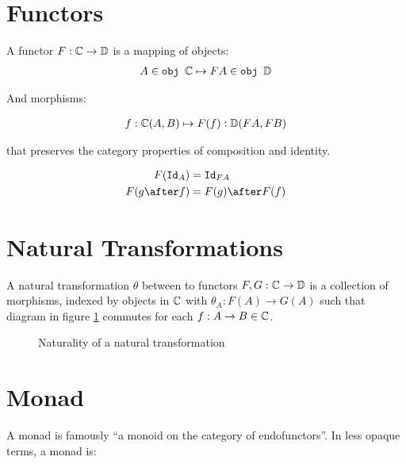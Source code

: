 \documentclass{Report}
\begin{document}
\section{Functors}
A functor $F: \mathbb{C} \rightarrow \mathbb{D}$ is a mapping of objects:
\begin{align}
    A\in\texttt{obj }\mathbb{C} \mapsto FA \in \texttt{obj }\mathbb{D}
\end{align}

And morphisms:

\begin{align}
    f: \mathbb{C}(A, B) \mapsto F(f): \mathbb{D}(FA, FB)
\end{align}

that preserves the category properties of composition and identity.

\begin{align}
    F(\Id{A}) & = \Id{FA} \\
    F(g\after f) & = F(g)\after F(f)
\end{align}

\section{Natural Transformations}

A natural transformation $\theta$ between to functors $F, G: \mathbb{C} \rightarrow \mathbb{D}$ is a collection of morphisms, indexed by objects in $\mathbb{C}$ with  $\theta_A: F(A) \rightarrow G(A)$ such that diagram in figure \ref{Naturality} commutes for each $f: A \rightarrow B \in \mathbb{C}$.

\begin{figure}
    \centering
    \begin{minipage}{0.45\textwidth}
        \label{Naturality}
        \centering
        \caption{Naturality of a natural transformation}
    \end{minipage}\hfill
\end{figure}



\section{Monad}
A monad is famously ``a monoid on the category of endofunctors''. In less opaque terms, a monad is:
\end{document}
